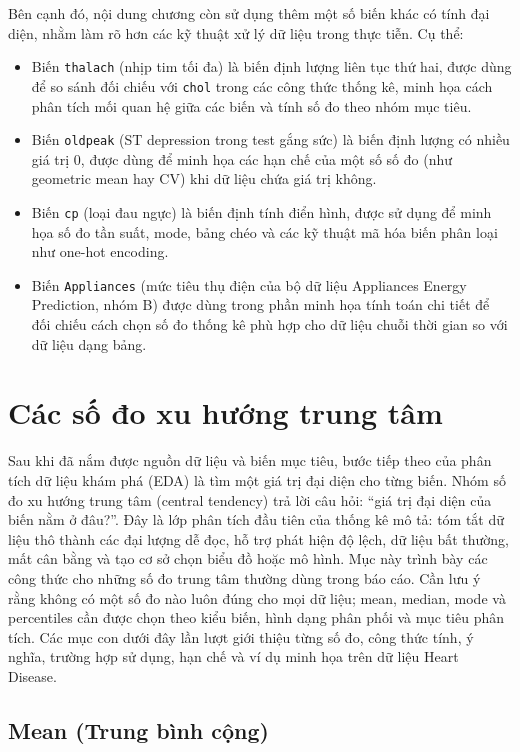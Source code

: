 Bên cạnh đó, nội dung chương còn sử dụng thêm một số biến khác có tính đại diện, nhằm làm rõ hơn các kỹ thuật xử lý dữ liệu trong thực tiễn. Cụ thể:

\begin{itemize}[leftmargin=1.6em,label=\textbullet]
 \item Biến \texttt{thalach} (nhịp tim tối đa) là biến định lượng liên tục thứ hai, được dùng để so sánh đối chiếu với \texttt{chol} trong các công thức thống kê, minh họa cách phân tích mối quan hệ giữa các biến và tính số đo theo nhóm mục tiêu.
 \item Biến \texttt{oldpeak} (ST depression trong test gắng sức) là biến định lượng có nhiều giá trị 0, được dùng để minh họa các hạn chế của một số số đo (như geometric mean hay CV) khi dữ liệu chứa giá trị không.
 \item Biến \texttt{cp} (loại đau ngực) là biến định tính điển hình, được sử dụng để minh họa số đo tần suất, mode, bảng chéo và các kỹ thuật mã hóa biến phân loại như one-hot encoding.
 \item Biến \texttt{Appliances} (mức tiêu thụ điện của bộ dữ liệu Appliances Energy Prediction, nhóm B) được dùng trong phần minh họa tính toán chi tiết để đối chiếu cách chọn số đo thống kê phù hợp cho dữ liệu chuỗi thời gian so với dữ liệu dạng bảng.
\end{itemize}

\section{Các số đo xu hướng trung tâm}

Sau khi đã nắm được nguồn dữ liệu và biến mục tiêu, bước tiếp theo của phân tích dữ liệu khám phá (EDA) là tìm một giá trị đại diện cho từng biến. Nhóm số đo xu hướng trung tâm (central tendency) trả lời câu hỏi: ``giá trị đại diện của biến nằm ở đâu?''. Đây là lớp phân tích đầu tiên của thống kê mô tả: tóm tắt dữ liệu thô thành các đại lượng dễ đọc, hỗ trợ phát hiện độ lệch, dữ liệu bất thường, mất cân bằng và tạo cơ sở chọn biểu đồ hoặc mô hình. Mục này trình bày các công thức cho những số đo trung tâm thường dùng trong báo cáo. Cần lưu ý rằng không có một số đo nào luôn đúng cho mọi dữ liệu; mean, median, mode và percentiles cần được chọn theo kiểu biến, hình dạng phân phối và mục tiêu phân tích. Các mục con dưới đây lần lượt giới thiệu từng số đo, công thức tính, ý nghĩa, trường hợp sử dụng, hạn chế và ví dụ minh họa trên dữ liệu Heart Disease.

\subsection{Mean (Trung bình cộng)}

